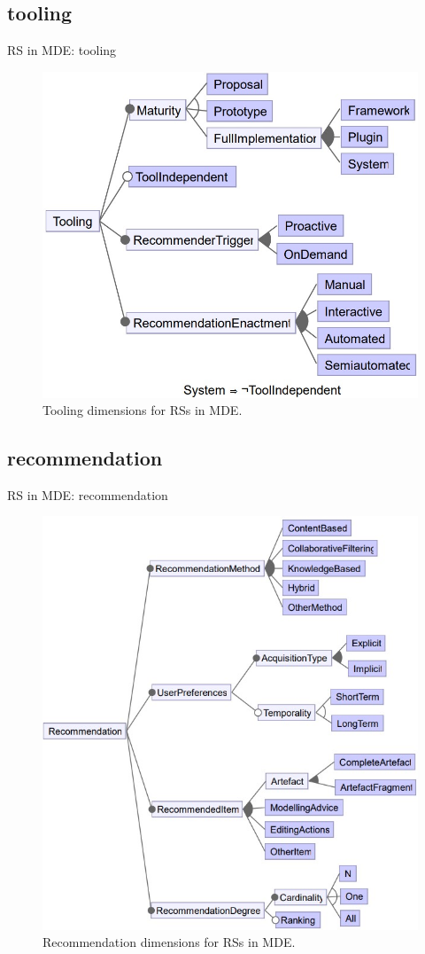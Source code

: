 \documentclass{beamer}
\begin{document}
\subsection{tooling}
\begin{frame}{RS in MDE: tooling}
    \begin{figure}
        \centering
        \includegraphics[width = 0.7\linewidth]{RS4MDE-pic/tooling.jpg}
        \caption{Tooling dimensions for RSs in MDE.}
    \end{figure}
\end{frame}


\subsection{recommendation}
\begin{frame}{RS in MDE: recommendation}
    \begin{figure}
        \centering
        \includegraphics[width = 0.55\linewidth]{RS4MDE-pic/recommendation.jpg}
        \caption{Recommendation dimensions for RSs in MDE.}
    \end{figure}
\end{frame}
\end{document}
